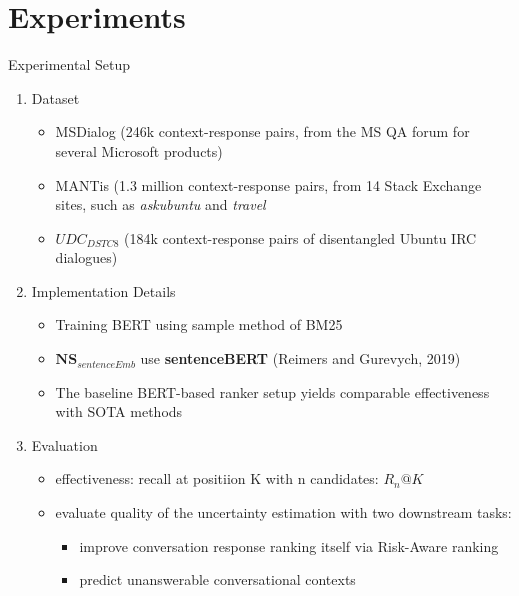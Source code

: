 \documentclass{beamer}
\begin{document}
\section{Experiments}
\begin{frame}{Experimental Setup}
\begin{enumerate}
    \item Dataset
        \begin{itemize}
            \item MSDialog (246k context-response pairs, from the MS QA forum for several Microsoft products)
            \item MANTis (1.3 million context-response pairs, from 14 Stack Exchange sites, such as \textsl{askubuntu} and \textsl{travel}
            \item $UDC_{DSTC8}$ (184k context-response pairs of disentangled Ubuntu IRC dialogues)
        \end{itemize}
    \item Implementation Details
        \begin{itemize}
            \item Training BERT using sample method of BM25
            \item $\textbf{NS}_{sentenceEmb}$ use \textbf{sentenceBERT} (Reimers and Gurevych, 2019)
            \item The baseline BERT-based ranker setup yields comparable effectiveness with SOTA methods
        \end{itemize}
    \item Evaluation
        \begin{itemize}
            \item effectiveness: recall at positiion K with n candidates: $R_n@K$
            \item evaluate quality of the uncertainty estimation with two downstream tasks:
                \begin{itemize}
                    \item improve conversation response ranking itself via Risk-Aware ranking
                    \item predict unanswerable conversational contexts
                \end{itemize}
        \end{itemize}
\end{enumerate}
    
\end{frame}
\end{document}
